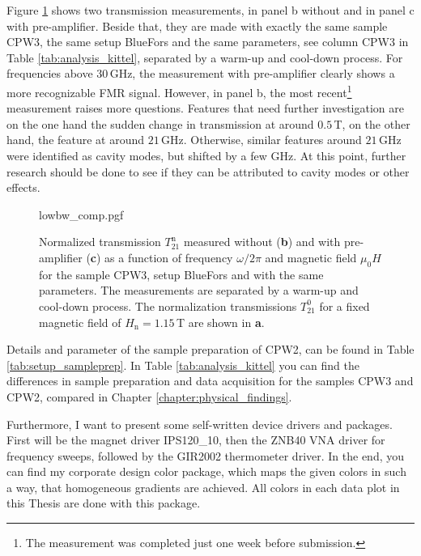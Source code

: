 Figure \ref{fig:analysis_temp_lowbw} shows two transmission measurements, in panel b without and in panel c with pre-amplifier. Beside that, they are made with exactly the same sample CPW3, the same setup BlueFors and the same parameters, see column CPW3 in Table \ref{tab:analysis_kittel}, separated by a warm-up and cool-down process. For frequencies above $30\,$GHz, the measurement with pre-amplifier clearly shows a more recognizable FMR signal. However, in panel b, the most recent\footnote{The measurement was completed just one week before submission.} measurement raises more questions. Features that need further investigation are on the one hand the sudden change in transmission at around $0.5\,$T, on the other hand, the feature at around $21\,$GHz.
Otherwise, similar features around $21\,$GHz were identified as cavity modes, but shifted by a few GHz. At this point, further research should be done to see if they can be attributed to cavity modes or other effects.
\begin{figure}
    \centering
    {lowbw_comp.pgf}
    \caption[Normalized transmission measured without and with pre-amplifier of sample CPW3]
    {Normalized transmission ${T}_{21}^\text{n}$ measured without (\textbf{\color{antiseeblau100}b}) and with pre-amplifier (\textbf{\color{antiseeblau100}c}) as a function of frequency $\omega/2\pi$ and magnetic field $\mu_0H$ for the sample CPW3, setup BlueFors and with the same parameters. The measurements are separated by a warm-up and cool-down process. The normalization transmissions ${T}_{21}^0$ for a fixed magnetic field of $H_\text{n}=1.15\,$T are shown in \textbf{\color{antiseeblau100}a}.}
    \label{fig:analysis_temp_lowbw}
\end{figure}

Details and parameter of the sample preparation of CPW2, can be found in Table \ref{tab:setup_sampleprep}. In Table \ref{tab:analysis_kittel} you can find the differences in sample preparation and data acquisition for the samples CPW3 and CPW2, compared in Chapter \ref{chapter:physical_findings}.

Furthermore, I want to present some self-written device drivers and packages. First will be the magnet driver IPS120\_10, then the ZNB40 VNA driver for frequency sweeps, followed by the GIR2002 thermometer driver. In the end, you can find my corporate design color package, which maps the given colors in such a way, that homogeneous gradients are achieved. All colors in each data plot in this Thesis are done with this package.


